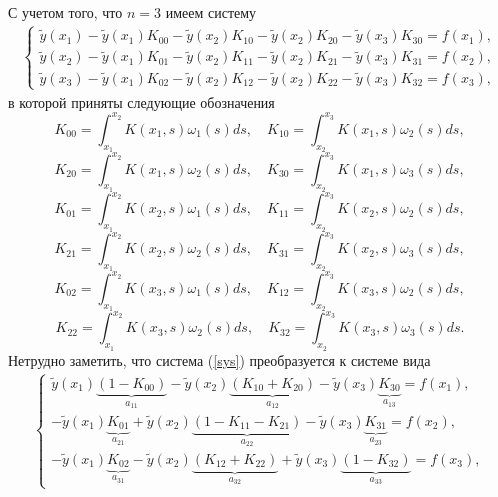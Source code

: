\documentclass{spisok-article}
\begin{document}
С учетом того, что $n=3$ имеем систему
\begin{equation}
	\begin{gathered}
		\begin{cases}
			\tilde y\left(x_1\right)-\tilde y\left(x_1\right)K_{00}-\tilde y\left(x_2\right) K_{10}-\tilde y\left(x_2\right) K_{20}-\tilde y\left(x_3\right)K_{30}=f\left(x_1\right),\\
			\tilde y\left(x_2\right)-\tilde y\left(x_1\right)K_{01}-\tilde y \left(x_2\right)K_{11}-\tilde{y}\left(x_2\right)K_{21}-\tilde y\left(x_3\right)K_{31}=f\left(x_2\right),\\
			\tilde y\left(x_3\right)-\tilde y\left(x_1\right)K_{02}-\tilde y\left(x_2\right) K_{12}-\tilde y\left(x_2\right) K_{22}-\tilde y\left(x_3\right) K_{32}=f\left(x_3\right),
		\end{cases}
	\label{sys}
	\end{gathered}
\end{equation}
в которой приняты следующие обозначения
$$
K_{00}=\int_{x_1}^{x_2}K\left(x_1,s\right)\omega_1\left(s\right) ds,\quad K_{10}=\int_{x_2}^{x_3}K\left(x_1,s\right)\omega_2\left(s\right) ds,
$$
$$
K_{20}=\int_{x_1}^{x_2}K\left(x_1,s\right)\omega_2\left(s\right) ds,\quad K_{30}=\int_{x_2}^{x_3}K\left(x_1,s\right)\omega_3\left(s\right) ds,
$$
$$
K_{01}=\int_{x_1}^{x_2}K\left(x_2,s\right)\omega_1\left(s\right) ds,\quad K_{11}=\int_{x_2}^{x_3}K\left(x_2,s\right)\omega_2\left(s\right) ds,
$$
$$
K_{21}=\int_{x_1}^{x_2}K\left(x_2,s\right)\omega_2\left(s\right) ds,\quad K_{31}=\int_{x_2}^{x_3}K\left(x_2,s\right)\omega_3\left(s\right) ds,
$$
$$
K_{02}=\int_{x_1}^{x_2}K\left(x_3,s\right)\omega_1\left(s\right) ds,\quad K_{12}=\int_{x_2}^{x_3}K\left(x_3,s\right)\omega_2\left(s\right) ds,
$$
$$
K_{22}=\int_{x_1}^{x_2}K\left(x_3,s\right)\omega_2\left(s\right) ds,\quad K_{32}=\int_{x_2}^{x_3}K\left(x_3,s\right)\omega_3\left(s\right) ds.
$$
Нетрудно заметить, что система (\ref{sys}) преобразуется к системе вида
$$
	\begin{gathered}
		\begin{cases}
			\tilde y\left(x_1\right)\underbrace{\left(1-K_{00}\right)}_{a_{11}}-\tilde y\left(x_2\right) \underbrace{\left(K_{10}+K_{20}\right)}_{a_{12}}-\tilde y\left(x_3\right) \underbrace{K_{30}}_{a_{13}}=f\left(x_1\right),\\
			-\tilde y\left(x_1\right) \underbrace{K_{01}}_{a_{21}}+\tilde y\left(x_2\right)\underbrace{\left(1-K_{11}-K_{21}\right)}_{a_{22}}-\tilde y\left(x_3\right) \underbrace{K_{31}}_{a_{23}}=f\left(x_2\right),\\
			-\tilde y\left(x_1\right) \underbrace{K_{02}}_{a_{31}}-\tilde y\left(x_2\right)\underbrace{\left(K_{12}+K_{22}\right)}_{a_{32}}+\tilde y\left(x_3\right)\underbrace{\left(1-K_{32}\right)}_{a_{33}}=f\left(x_3\right),
		\end{cases}
	\end{gathered}
$$
\end{document}
